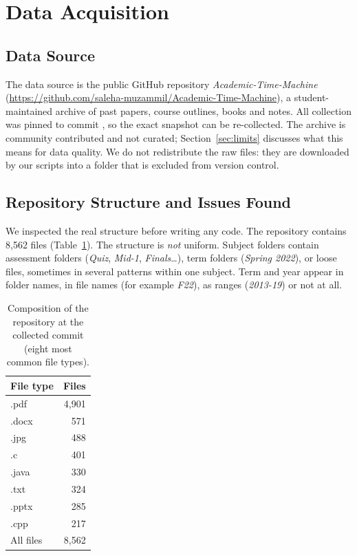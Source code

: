 \documentclass[11pt,a4paper]{article}
\begin{document}
\section{Data Acquisition}

\subsection{Data Source}
The data source is the public GitHub repository \emph{Academic-Time-Machine} (\url{https://github.com/saleha-muzammil/Academic-Time-Machine}), a student-maintained archive of past papers, course outlines, books and notes. All collection was pinned to commit \texttt{}, so the exact snapshot can be re-collected. The archive is community contributed and not curated; Section~\ref{sec:limits} discusses what this means for data quality. We do not redistribute the raw files: they are downloaded by our scripts into a folder that is excluded from version control.

\subsection{Repository Structure and Issues Found}
We inspected the real structure before writing any code. The repository contains 8{,}562 files (Table~\ref{tab:repo}). The structure is \emph{not} uniform. Subject folders contain assessment folders (\emph{Quiz}, \emph{Mid-1}, \emph{Finals}\ldots), term folders (\emph{Spring 2022}), or loose files, sometimes in several patterns within one subject. Term and year appear in folder names, in file names (for example \emph{F22}), as ranges (\emph{2013-19}) or not at all.

\begin{table}[H]
\centering
\caption{Composition of the repository at the collected commit (eight most common file types).}
\label{tab:repo}
\begin{tabular}{lr}
\toprule
File type & Files \\
\midrule
.pdf & 4{,}901 \\
.docx & 571 \\
.jpg & 488 \\
.c & 401 \\
.java & 330 \\
.txt & 324 \\
.pptx & 285 \\
.cpp & 217 \\
\midrule
All files & 8{,}562 \\
\bottomrule
\end{tabular}
\end{table}
\end{document}
